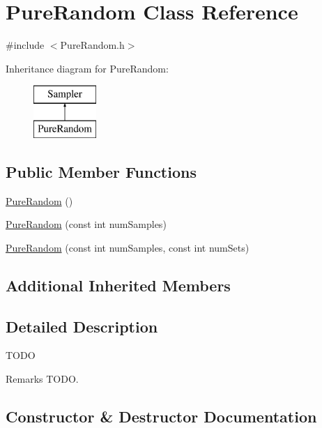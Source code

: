 \hypertarget{class_pure_random}{}\section{Pure\+Random Class Reference}
\label{class_pure_random}


{\ttfamily \#include $<$Pure\+Random.\+h$>$}

Inheritance diagram for Pure\+Random\+:\begin{figure}[H]
\begin{center}
\leavevmode
\includegraphics[height=2.000000cm]{class_pure_random}
\end{center}
\end{figure}
\subsection*{Public Member Functions}
\begin{DoxyCompactItemize}
\item 
\hyperlink{class_pure_random_a61f8ed0fdd5f477c4617b29460fac5e3}{Pure\+Random} ()
\item 
\hyperlink{class_pure_random_a071f6a64e2019dcf303365827707f490}{Pure\+Random} (const int num\+Samples)
\item 
\hyperlink{class_pure_random_a32af40bab93939c82bbd59605d5396bd}{Pure\+Random} (const int num\+Samples, const int num\+Sets)
\end{DoxyCompactItemize}
\subsection*{Additional Inherited Members}


\subsection{Detailed Description}
T\+O\+DO \begin{DoxyRemark}{Remarks}
T\+O\+DO. 
\end{DoxyRemark}


\subsection{Constructor \& Destructor Documentation}
\hypertarget{class_pure_random_a61f8ed0fdd5f477c4617b29460fac5e3}{}\label{class_pure_random_a61f8ed0fdd5f477c4617b29460fac5e3} 
